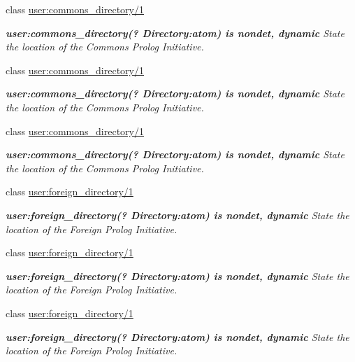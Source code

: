 \begin{DoxyCompactItemize}
class \hyperlink{classuser_1_1commons__directory_21}{user\+:commons\+\_\+directory/1}
\begin{DoxyCompactList}\small\item\em {\bfseries  user\+:commons\+\_\+directory(? {\itshape Directory}\+:atom) is nondet, dynamic } State the location of the Commons Prolog Initiative. \end{DoxyCompactList}\item 
class \hyperlink{classuser_1_1commons__directory_21}{user\+:commons\+\_\+directory/1}
\begin{DoxyCompactList}\small\item\em {\bfseries  user\+:commons\+\_\+directory(? {\itshape Directory}\+:atom) is nondet, dynamic } State the location of the Commons Prolog Initiative. \end{DoxyCompactList}\item 
class \hyperlink{classuser_1_1commons__directory_21}{user\+:commons\+\_\+directory/1}
\begin{DoxyCompactList}\small\item\em {\bfseries  user\+:commons\+\_\+directory(? {\itshape Directory}\+:atom) is nondet, dynamic } State the location of the Commons Prolog Initiative. \end{DoxyCompactList}\item 
class \hyperlink{classuser_1_1foreign__directory_21}{user\+:foreign\+\_\+directory/1}
\begin{DoxyCompactList}\small\item\em {\bfseries  user\+:foreign\+\_\+directory(? {\itshape Directory}\+:atom) is nondet, dynamic } State the location of the Foreign Prolog Initiative. \end{DoxyCompactList}\item 
class \hyperlink{classuser_1_1foreign__directory_21}{user\+:foreign\+\_\+directory/1}
\begin{DoxyCompactList}\small\item\em {\bfseries  user\+:foreign\+\_\+directory(? {\itshape Directory}\+:atom) is nondet, dynamic } State the location of the Foreign Prolog Initiative. \end{DoxyCompactList}\item 
class \hyperlink{classuser_1_1foreign__directory_21}{user\+:foreign\+\_\+directory/1}
\begin{DoxyCompactList}\small\item\em {\bfseries  user\+:foreign\+\_\+directory(? {\itshape Directory}\+:atom) is nondet, dynamic } State the location of the Foreign Prolog Initiative. \end{DoxyCompactList}\item 

\end{DoxyCompactItemize}
